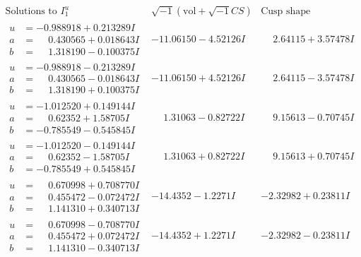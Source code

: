 \documentclass[1p]{elsarticle_modified}
\theoremstyle{definition}
\newcommand{\I}{\sqrt{-1}}
\begin{document}
$$\begin{array}{c|c|c}  
\text{Solutions to }I^u_{1}& \I (\text{vol} + \sqrt{-1}CS) & \text{Cusp shape}\\
 \hline 
\begin{aligned}
u &= -0.988918 + 0.213289 I \\
a &= \phantom{-}0.430565 + 0.018643 I \\
b &= \phantom{-}1.318190 - 0.100375 I\end{aligned}
 & -11.06150 - 4.52126 I & \phantom{-}2.64115 + 3.57478 I \\ \hline\begin{aligned}
u &= -0.988918 - 0.213289 I \\
a &= \phantom{-}0.430565 - 0.018643 I \\
b &= \phantom{-}1.318190 + 0.100375 I\end{aligned}
 & -11.06150 + 4.52126 I & \phantom{-}2.64115 - 3.57478 I \\ \hline\begin{aligned}
u &= -1.012520 + 0.149144 I \\
a &= \phantom{-}0.62352 + 1.58705 I \\
b &= -0.785549 - 0.545845 I\end{aligned}
 & \phantom{-}1.31063 - 0.82722 I & \phantom{-}9.15613 - 0.70745 I \\ \hline\begin{aligned}
u &= -1.012520 - 0.149144 I \\
a &= \phantom{-}0.62352 - 1.58705 I \\
b &= -0.785549 + 0.545845 I\end{aligned}
 & \phantom{-}1.31063 + 0.82722 I & \phantom{-}9.15613 + 0.70745 I \\ \hline\begin{aligned}
u &= \phantom{-}0.670998 + 0.708770 I \\
a &= \phantom{-}0.455472 - 0.072472 I \\
b &= \phantom{-}1.141310 + 0.340713 I\end{aligned}
 & -14.4352 - 1.2271 I & -2.32982 + 0.23811 I \\ \hline\begin{aligned}
u &= \phantom{-}0.670998 - 0.708770 I \\
a &= \phantom{-}0.455472 + 0.072472 I \\
b &= \phantom{-}1.141310 - 0.340713 I\end{aligned}
 & -14.4352 + 1.2271 I & -2.32982 - 0.23811 I \\ \hline\begin{aligned}

\end{aligned}
\end{array}$$
\end{document}
